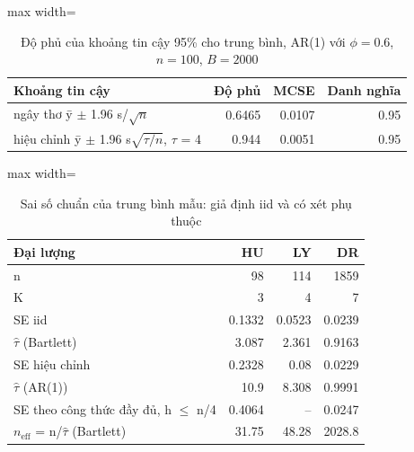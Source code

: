 \begin{table}[H]
\centering\footnotesize
\caption{Độ phủ của khoảng tin cậy 95\% cho trung bình, AR(1) với $\phi=0.6$, $n=100$, $B=2000$}\label{tab:tab_b11_03_coverage}
\begin{adjustbox}{max width=\linewidth}
\begin{tabular}{|>{\raggedright\arraybackslash}p{}|r|r|r|}
\toprule
Khoảng tin cậy & Độ phủ & MCSE & Danh nghĩa \\
\midrule
ngây thơ  ȳ $\pm$ 1.96 s/$\sqrt{n}$ & 0.6465 & 0.0107 & 0.95 \\[3pt]
hiệu chỉnh  ȳ $\pm$ 1.96 s$\sqrt{\tau/n}$, $\tau$ = 4 & 0.944 & 0.0051 & 0.95 \\[3pt]
\bottomrule
\end{tabular}
\end{adjustbox}\par{}
\end{table}
\begin{table}[H]
\centering\footnotesize
\caption{Sai số chuẩn của trung bình mẫu: giả định iid và có xét phụ thuộc}\label{tab:tab_b11_03_mean_se}
\begin{adjustbox}{max width=\linewidth}
\begin{tabular}{|l|r|r|r|}
\toprule
Đại lượng & HU & LY & DR \\
\midrule
n & 98 & 114 & 1859 \\
K & 3 & 4 & 7 \\
SE iid & 0.1332 & 0.0523 & 0.0239 \\
$\hat{\tau}$ (Bartlett) & 3.087 & 2.361 & 0.9163 \\
SE hiệu chỉnh & 0.2328 & 0.08 & 0.0229 \\
$\hat{\tau}$ (AR(1)) & 10.9 & 8.308 & 0.9991 \\
SE theo công thức đầy đủ, h $\le$ n/4 & 0.4064 & – & 0.0247 \\
$n_{\mathrm{eff}}$ = n/$\hat{\tau}$ (Bartlett) & 31.75 & 48.28 & 2028.8 \\
\bottomrule
\end{tabular}
\end{adjustbox}\par{}
\end{table}
